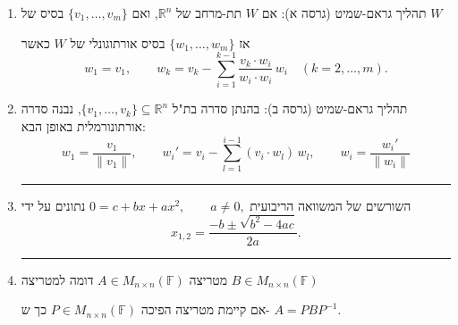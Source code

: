 \documentclass[12pt, a4paper]{article}
\newcommand{\ff}{\mathbb{F}}
\newcommand{\rr}{\mathbb{R}}
\begin{document}
\begin{enumerate}
\item תהליך גראם-שמיט (גרסה א):
אם $W$ תת-מרחב של $\rr^n$, ואם $\{v_1,\ldots,v_m\}$ בסיס של $W$

אז $\{w_1,\ldots,w_m\}$ בסיס אורתוגונלי של $W$ כאשר
\[
w_1=v_1,\qquad
w_k=v_k-\sum_{i=1}^{k-1}\frac{ v_k\cdot w_i}{ w_i\cdot w_i}\,w_i
\quad (k=2,\ldots,m).
\]
\item תהליך גראם-שמיט (גרסה ב):
בהנתן סדרה בת"ל
$\{v_1,\ldots,v_k\}\subseteq \rr^n$, נבנה סדרה אורתונורמלית באופן הבא:
\[
w_1=\frac{v_1}{\|v_1\|},\qquad
w_i'=v_i-\sum_{l=1}^{i-1} (v_i\cdot w_l)\,w_l,\qquad w_i = \frac{w_i'}{\|w_i\|}
\]

\noindent\rule{\textwidth-30pt}{0.4pt}

\item השורשים של המשוואה הריבועית
$
0=c+bx+ax^2,\qquad a\ne 0,
$
נתונים על ידי
\[
x_{1,2}=\frac{-b\pm\sqrt{b^2-4ac}}{2a}.
\]

\noindent\rule{\textwidth-30pt}{0.4pt}

\item מטריצה $A\in M_{n\times n}(\ff)$ דומה למטריצה $B\in M_{n\times n}(\ff)$ 

אם
קיימת 
מטריצה הפיכה
$P\in M_{n\times n}(\ff)$ כך ש-
$A=PBP^{-1}$.
\end{enumerate}
\end{document}
